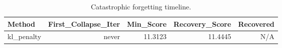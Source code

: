 \begin{table}[htbp]
\centering
\caption{Catastrophic forgetting timeline.}
\label{tab:forgetting}
\begin{tabular}{lrrrr}
\toprule
\textbf{Method} & \textbf{First\_Collapse\_Iter} & \textbf{Min\_Score} & \textbf{Recovery\_Score} & \textbf{Recovered} \\
\midrule
kl\_penalty & never & 11.3123 & 11.4445 & N/A \\
\bottomrule
\end{tabular}
\end{table}